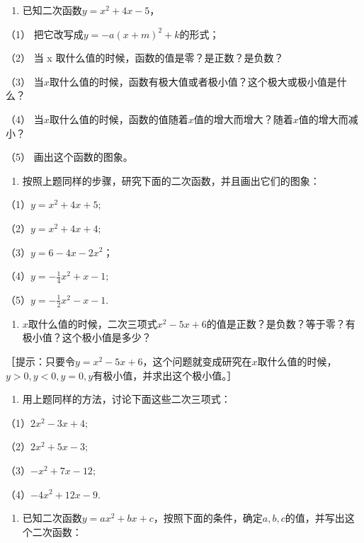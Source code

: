 \begin{enumerate}[start=10]
\item
  已知二次函数\(y = x^{2} + 4x - 5\)，
\end{enumerate}

（1） 把它改写成\(y=-a(x+m)^{2}+k\)的形式；

（2） 当 x 取什么值的时候，函数的值是零？是正数？是负数？

（3）
当\(x\)取什么值的时候，函数有极大值或者极小值？这个极大或极小值是什么？

（4）
当\(x\)取什么值的时候，函数的值随着\(x\)值的增大而增大？随着\(x\)值的增大而减小？

（5） 画出这个函数的图象。

\begin{enumerate}[start=11]
\item
  按照上题同样的步骤，研究下面的二次函数，并且画出它们的图象：
\end{enumerate}

（1）\(y = x^{2} + 4x + 5;\)

（2）\(y = x^{2} + 4x + 4;\)

（3）\(y = 6 - 4x - 2x^2\)；

（4）\(y = -\frac{1}{4} x^2 + x - 1;\)

（5）\(y = -\frac{1}{2} x^2 - x - 1.\)
\begin{enumerate}[start=12]
\item
  \(x\)取什么值的时候，二次三项式\(x^{2} - 5x + 6\)的值是正数？是负数？等于零？有极小值？这个极小值是多少？
\end{enumerate}

［提示：只要令\(y = x^{2} - 5x + 6\)，这个问题就变成研究在\(x\)取什么值的时候，\(y > 0, y < 0, y = 0, y\)有极小值，并求出这个极小值。］

\begin{enumerate}[start=13]
\item
  用上题同样的方法，讨论下面这些二次三项式：
\end{enumerate}

（1）\(2x^{2} - 3x + 4;\)

（2）\(2x^{2} + 5x - 3;\)

（3）\(-x^{2} + 7x - 12;\)

（4）\(-4x^{2} + 12x - 9.\)

\begin{enumerate}[start=14]
\item
  已知二次函数\(y = ax^2 + bx + c\)，按照下面的条件，确定\(a, b, c\)的值，并写出这个二次函数：
\end{enumerate}

